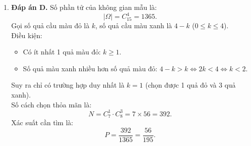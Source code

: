\documentclass[12pt,a4paper]{article}
\begin{document}
\begin{enumerate}[label=\textbf{Câu \arabic*:}, leftmargin=*]
\item \textbf{Đáp án D.}
Số phần tử của không gian mẫu là:
$$|\Omega| = C_{15}^4 = 1365.$$
Gọi số quả cầu màu đỏ là $k$, số quả cầu màu xanh là $4 - k$ ($0 \le k \le 4$).\\
Điều kiện:
\begin{itemize}
    \item Có ít nhất 1 quả màu đỏ: $k \ge 1$.
    \item Số quả màu xanh nhiều hơn số quả màu đỏ: $4 - k > k \iff 2k < 4 \iff k < 2$.
\end{itemize}
Suy ra chỉ có trường hợp duy nhất là $k = 1$ (chọn được 1 quả đỏ và 3 quả xanh).\\
Số cách chọn thỏa mãn là:
$$N = C_7^1 \cdot C_8^3 = 7 \times 56 = 392.$$
Xác suất cần tìm là:
$$P = \dfrac{392}{1365} = \dfrac{56}{195}.$$
\end{enumerate}
\end{document}
